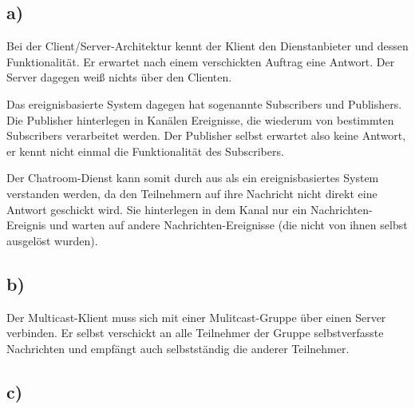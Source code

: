 \subsection*{a)}
Bei der Client/Server-Architektur kennt der Klient den Dienstanbieter und dessen Funktionalität.
Er erwartet nach einem verschickten Auftrag eine Antwort. 
Der Server dagegen weiß nichts über den Clienten.

Das ereignisbasierte System dagegen hat sogenannte Subscribers und Publishers.
Die Publisher hinterlegen in Kanälen Ereignisse, die wiederum von bestimmten Subscribers verarbeitet werden. 
Der Publisher selbst erwartet also keine Antwort, er kennt nicht einmal die Funktionalität des Subscribers.

Der Chatroom-Dienst kann somit durch aus als ein ereignisbasiertes System verstanden werden, da den Teilnehmern auf ihre Nachricht nicht direkt eine Antwort geschickt wird. Sie hinterlegen in dem Kanal nur ein Nachrichten-Ereignis und warten auf andere Nachrichten-Ereignisse (die nicht von ihnen selbst ausgelöst wurden).

\subsection*{b)}
Der Multicast-Klient muss sich mit einer Mulitcast-Gruppe über einen Server verbinden.
Er selbst verschickt an alle Teilnehmer der Gruppe selbstverfasste Nachrichten und empfängt auch selbstständig die anderer Teilnehmer.


\subsection*{c)}

